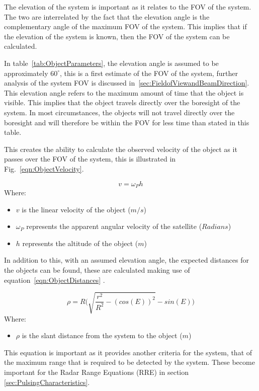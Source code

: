 \documentclass[11pt]{witseiepaper}
\begin{document}
\begin{bibunit}[witseie]
The elevation of the system is important as it relates to the FOV of the system. The two are interrelated by the fact that the elevation angle is the complementary angle of the maximum FOV of the system. This implies that if the elevation of the system is known, then the FOV of the system can be calculated.

In table~\ref{tab:ObjectParameters}, the elevation angle is assumed to be approximately $60^{\circ}$, this is a first estimate of the FOV of the system, further analysis of the system FOV is discussed in~\ref{sec:FieldofViewandBeamDirection}. This elevation angle refers to the maximum amount of time that the object is visible. This implies that the object travels directly over the boresight of the system. In most circumstances, the objects will not travel directly over the boresight and will therefore be within the FOV for less time than stated in this table.

This creates the ability to calculate the observed velocity of the object as it passes over the FOV of the system, this is illustrated in Fig.~\ref{eqn:ObjectVelocity}.

\begin{equation} \label{eqn:ObjectVelocity}
    v = \omega_{P} h
\end{equation}
Where:
\begin{itemize}
    \item $v$ is the linear velocity of the object ($m/s$)
    \item $\omega_{P}$ represents the apparent angular velocity of the satellite ($Radians$)
    \item $h$ represents the altitude of the object ($m$)
\end{itemize}


In addition to this, with an assumed elevation angle, the expected distances for the objects can be found, these are calculated making use of equation~\ref{eqn:ObjectDistances} \cite{ObservableTime}.


\begin{equation} \label{eqn:ObjectDistances}
    \rho = R \Bigg(\sqrt{\frac{r^2}{R^2} - (cos(E))^2} - sin(E) \Bigg)
    \end{equation}
Where:
\begin{itemize}
    \item $\rho$ is the slant distance from the system to the object ($m$)
\end{itemize}
This equation is important as it provides another criteria for the system, that of the maximum range that is required to be detected by the system. These become important for the Radar Range Equations (RRE) in section \ref{sec:PulsingCharacteristics}.


\end{bibunit}
\end{document}
